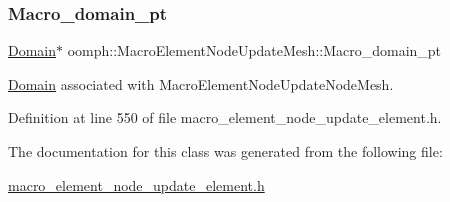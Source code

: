 \mbox{\label{classoomph_1_1MacroElementNodeUpdateMesh_a27a421ccba8fb0d180f3250da82b2a15}} 
\subsubsection{\texorpdfstring{Macro\+\_\+domain\+\_\+pt}{Macro\_domain\_pt}}
{\footnotesize\ttfamily \hyperlink{classoomph_1_1Domain}{Domain}$\ast$ oomph\+::\+Macro\+Element\+Node\+Update\+Mesh\+::\+Macro\+\_\+domain\+\_\+pt\hspace{0.3cm}{\ttfamily [private]}}



\hyperlink{classoomph_1_1Domain}{Domain} associated with Macro\+Element\+Node\+Update\+Node\+Mesh. 



Definition at line 550 of file macro\+\_\+element\+\_\+node\+\_\+update\+\_\+element.\+h.



The documentation for this class was generated from the following file\+:\begin{DoxyCompactItemize}
\item 
\hyperlink{macro__element__node__update__element_8h}{macro\+\_\+element\+\_\+node\+\_\+update\+\_\+element.\+h}\end{DoxyCompactItemize}
